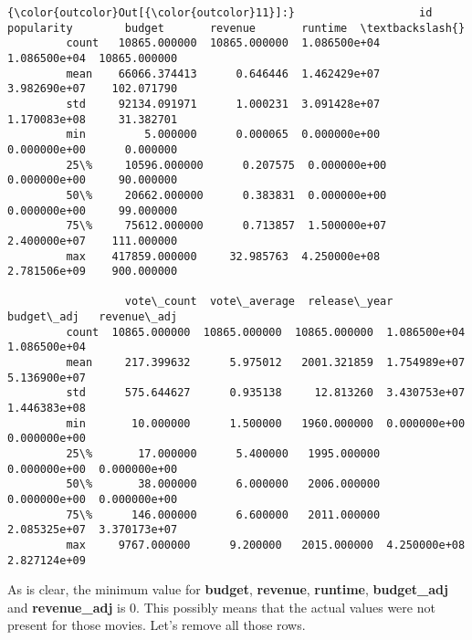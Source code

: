 \documentclass[11pt]{article}
\begin{document}
\begin{Verbatim}[commandchars=\\\{\}]
{\color{outcolor}Out[{\color{outcolor}11}]:}                   id    popularity        budget       revenue       runtime  \textbackslash{}
         count   10865.000000  10865.000000  1.086500e+04  1.086500e+04  10865.000000   
         mean    66066.374413      0.646446  1.462429e+07  3.982690e+07    102.071790   
         std     92134.091971      1.000231  3.091428e+07  1.170083e+08     31.382701   
         min         5.000000      0.000065  0.000000e+00  0.000000e+00      0.000000   
         25\%     10596.000000      0.207575  0.000000e+00  0.000000e+00     90.000000   
         50\%     20662.000000      0.383831  0.000000e+00  0.000000e+00     99.000000   
         75\%     75612.000000      0.713857  1.500000e+07  2.400000e+07    111.000000   
         max    417859.000000     32.985763  4.250000e+08  2.781506e+09    900.000000   
         
                  vote\_count  vote\_average  release\_year    budget\_adj   revenue\_adj  
         count  10865.000000  10865.000000  10865.000000  1.086500e+04  1.086500e+04  
         mean     217.399632      5.975012   2001.321859  1.754989e+07  5.136900e+07  
         std      575.644627      0.935138     12.813260  3.430753e+07  1.446383e+08  
         min       10.000000      1.500000   1960.000000  0.000000e+00  0.000000e+00  
         25\%       17.000000      5.400000   1995.000000  0.000000e+00  0.000000e+00  
         50\%       38.000000      6.000000   2006.000000  0.000000e+00  0.000000e+00  
         75\%      146.000000      6.600000   2011.000000  2.085325e+07  3.370173e+07  
         max     9767.000000      9.200000   2015.000000  4.250000e+08  2.827124e+09  
\end{Verbatim}
            
    As is clear, the minimum value for \textbf{budget}, \textbf{revenue},
\textbf{runtime}, \textbf{budget\_adj} and \textbf{revenue\_adj} is 0.
This possibly means that the actual values were not present for those
movies. Let's remove all those rows.
\end{document}
